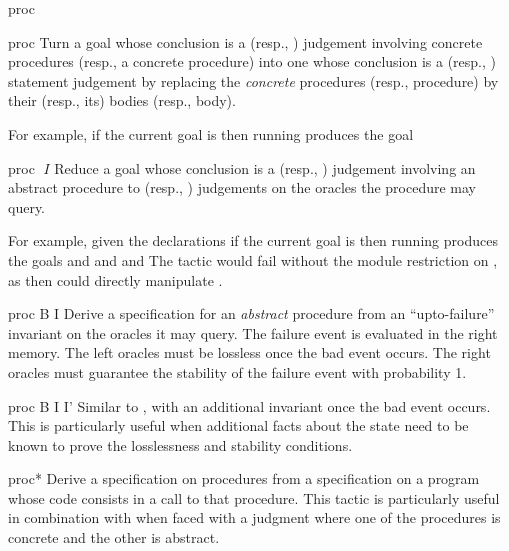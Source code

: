 \begin{tactic}{proc}
  \begin{tsyntax}{proc}
    Turn a goal whose conclusion is a \prhl (resp., \phl) judgement
    involving concrete procedures (resp., a concrete procedure)
    into one whose conclusion is a \prhl (resp., \phl) statement
    judgement by replacing the \emph{concrete} procedures (resp.,
    procedure) by their (resp., its) bodies (resp., body).

  \bigskip
  For example, if the current goal is
   then
  running 
  produces the goal
  \end{tsyntax}

  \begin{tsyntax}{proc $\;I$}
    Reduce a goal whose conclusion is a \prhl (resp., \phl) judgement
    involving an abstract procedure to \prhl (resp., \phl) judgements
    on the oracles the procedure may query.

  \bigskip
  For example, given the declarations
  if the current goal is
   then
  running 
  produces the goals
  and
  and
  and
  The tactic would fail without the module restriction  on
  , as then  could directly manipulate .
  \end{tsyntax}

  \begin{tsyntax}{proc B I}
  Derive a specification for an \emph{abstract} procedure from an
  ``upto-failure'' invariant on the oracles it may query. The failure
  event  is evaluated in the right memory. The left oracles
  must be lossless once the bad event occurs. The right oracles must
  guarantee the stability of the failure event with probability 1.
  \end{tsyntax}

  \begin{tsyntax}{proc B I I'}
  Similar to , with an additional invariant once the bad
  event occurs. This is particularly useful when additional facts
  about the state need to be known to prove the losslessness and
  stability conditions.
  \end{tsyntax}

  \begin{tsyntax}{proc*}
  Derive a specification on procedures from a specification on a
  program whose code consists in a call to that procedure. This tactic
  is particularly useful in combination with  when
  faced with a \prhl judgment where one of the procedures is concrete
  and the other is abstract.
  \end{tsyntax}
\end{tactic}
